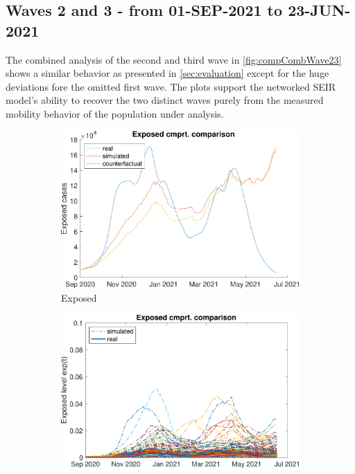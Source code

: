 \subsection{Waves 2 and 3 - from 01-SEP-2021 to 23-JUN-2021}

The combined analysis of the second and third wave in \autoref{fig:compCombWave23} shows a similar behavior as presented in \autoref{sec:evaluation} except for the huge deviations fore the omitted first wave. The plots support the networked SEIR model's ability to recover the two distinct waves purely from the measured mobility behavior of the population under analysis.

\begin{figure}[hbtp]
     \centering
     \begin{subfigure}[b]{.45\linewidth}
         \centering
         \includegraphics[width=\linewidth]{img/210907_224622_combined_wave23/figures/COMP_exp}
         \caption{Exposed}
         \label{fig:compAggrCombWave23Exp}
     \end{subfigure}
     \hfill
     \begin{subfigure}[b]{.45\linewidth}
         \centering
         \includegraphics[width=\linewidth]{img/210907_224622_combined_wave23/figures/SEIR_e_sim-vs-real}

\end{subfigure}
\end{figure}
